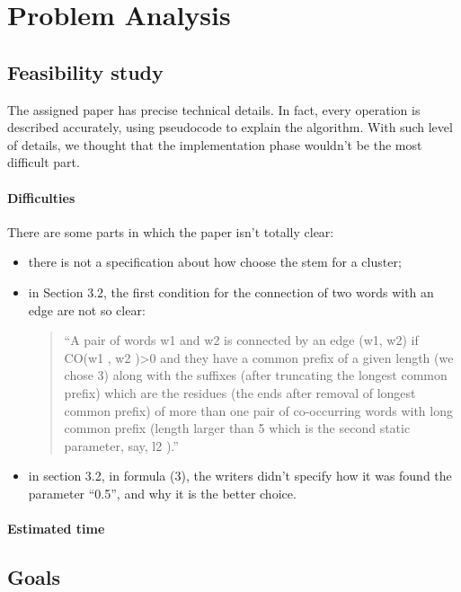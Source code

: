 \section{Problem Analysis}
    \subsection{Feasibility study}
        The assigned paper has precise technical details. In fact, every operation is described accurately, using pseudocode to explain the algorithm. With such level of details, we thought that the implementation phase wouldn't be the most difficult part. 	
        \paragraph{Difficulties}
            There are some parts in which the paper isn't totally clear:
            \begin{itemize}
            \item there is not a specification about how choose the stem for a cluster;
            \item in Section 3.2, the first condition for the connection of two words with an edge are not so clear: 
            \begin{quotation}
            ``A pair of words w1 and w2 is connected by an edge (w1, w2) if CO(w1 , w2 )\textgreater 0 and they have a common prefix of a given length (we chose 3) along with the suffixes (after truncating the longest common prefix) which are the residues (the ends after removal of longest common prefix) of more than one pair of co-occurring words with long common prefix (length larger than 5 which is the second static parameter, say, l2 ).''
            \end{quotation}

            \item in section 3.2, in formula (3), the writers didn't specify how it was found the parameter ``0.5'', and why it is the better choice.
            \end{itemize}
        \paragraph{Estimated time}
    \subsection{Goals}